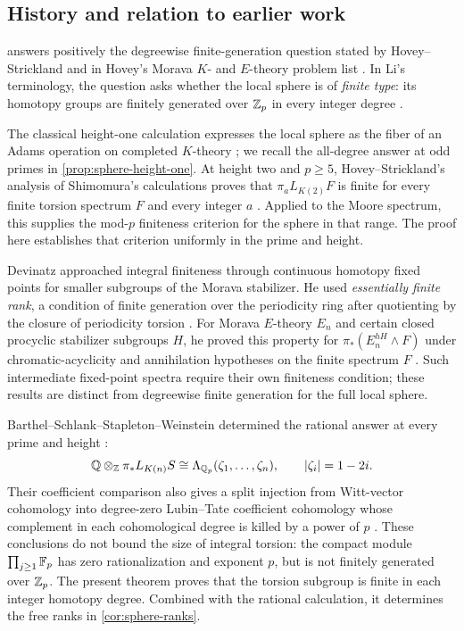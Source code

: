\subsection{History and relation to earlier work}
\label{sec:history}

 answers positively the degreewise finite-generation
question stated by Hovey--Strickland \citep[Problem~16.2]{hoveyStrickland1999}
and in Hovey's Morava $K$- and $E$-theory problem list
\citep[Problem~1]{hoveyProblems}.
In Li's terminology, the question asks whether the local sphere is of
\emph{finite type}: its homotopy groups are finitely generated over $\mathbb Z_p$
in every integer degree \citep[Introduction]{liFiniteType2021}.

The classical height-one calculation expresses the local sphere as the
fiber of an Adams operation on completed $K$-theory
\citep[\S\S1--2]{hopkinsKOne}; we recall the all-degree answer at odd
primes in \cref{prop:sphere-height-one}.
At height two and $p\geq5$, Hovey--Strickland's analysis of Shimomura's
calculations proves that $\pi_aL_{K(2)}F$ is finite for every finite
torsion spectrum $F$ and every integer $a$
\citep[\S15.2 and Theorem~15.1]{hoveyStrickland1999}.
Applied to the Moore spectrum, this supplies the mod-$p$ finiteness
criterion for the sphere in that range. The proof here establishes
that criterion uniformly in the prime and height.

Devinatz approached integral finiteness through continuous homotopy
fixed points for smaller subgroups of the Morava stabilizer. He used
\emph{essentially finite rank}, a condition of finite generation over
the periodicity ring after quotienting by the closure of periodicity
torsion \citep[\S4]{devinatzHomotopy2007}. For Morava $E$-theory $E_n$
and certain closed procyclic stabilizer subgroups $H$, he proved
this property for $\pi_*(E_n^{hH}\wedge F)$ under chromatic-acyclicity
and annihilation hypotheses on the finite spectrum $F$
\citep{devinatzFiniteness2008}.
Such intermediate fixed-point spectra require their own finiteness
condition; these results are distinct from degreewise finite
generation for the full local sphere.

Barthel--Schlank--Stapleton--Weinstein determined the rational answer
at every prime and height \citep[Theorem~A]{bssw2024}:
\[
 \mathbb Q\otimes_{\mathbb Z}\pi_*L_{K(n)}S
 \cong \Lambda_{\mathbb Q_p}(\zeta_1,\ldots,\zeta_n),
 \qquad |\zeta_i|=1-2i.
\]
Their coefficient comparison also gives a split injection from
Witt-vector cohomology into degree-zero Lubin--Tate coefficient
cohomology whose complement in each cohomological degree is killed
by a power of $p$
\citep[Theorem~B]{bssw2024}.
These conclusions do not bound the size of integral torsion: the compact
module $\prod_{j\geq1}\mathbb F_p$ has zero rationalization and exponent $p$,
but is not finitely generated over $\mathbb Z_p$.
The present theorem proves that the torsion subgroup is finite in
each integer homotopy degree.
Combined with the rational calculation, it determines the free ranks
in \cref{cor:sphere-ranks}.

